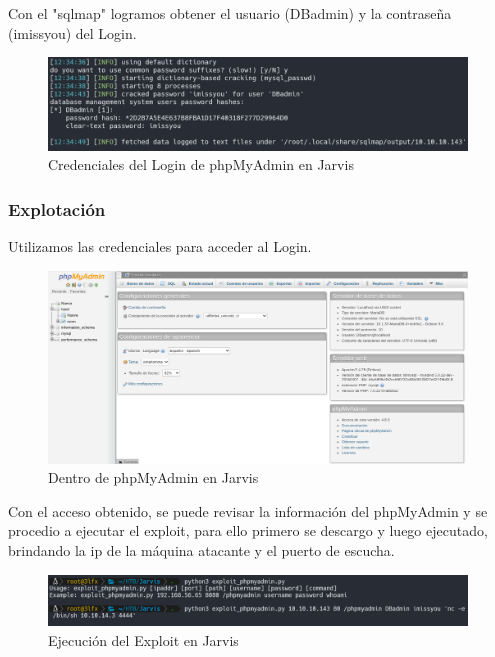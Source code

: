         \large{Con el "sqlmap" logramos obtener el usuario (DBadmin) y la contraseña (imissyou) del Login.}
        \par
        \begin{figure}[H]
            \centering
            \includegraphics[width=0.99\textwidth]{imagenes/jarvis/09_db_pass_jarvis.png}
            \caption{Credenciales del Login de phpMyAdmin en Jarvis}
        \end{figure}

    \subsubsection{Explotación}

        \large{Utilizamos las credenciales para acceder al Login.}
        \par
        \begin{figure}[H]
            \centering
            \includegraphics[width=0.99\textwidth]{imagenes/jarvis/10_phpmyadmin_dentro_jarvis.png}
            \caption{Dentro de phpMyAdmin en Jarvis}
        \end{figure}

        \large{Con el acceso obtenido, se puede revisar la información del phpMyAdmin y se procedio a ejecutar el exploit, para ello primero se descargo y luego ejecutado, brindando la ip de la máquina atacante y el puerto de escucha.}
        \par
        \begin{figure}[H]
            \centering
            \includegraphics[width=0.99\textwidth]{imagenes/jarvis/11_exploit_phpmyadmin_jarvis.png}
            \caption{Ejecución del Exploit en Jarvis}
        \end{figure}

